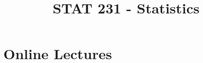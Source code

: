 
\title{STAT 231 - Statistics}


\maketitle

\tableofcontents

\newpage
























\chapter{Online Lectures}
















